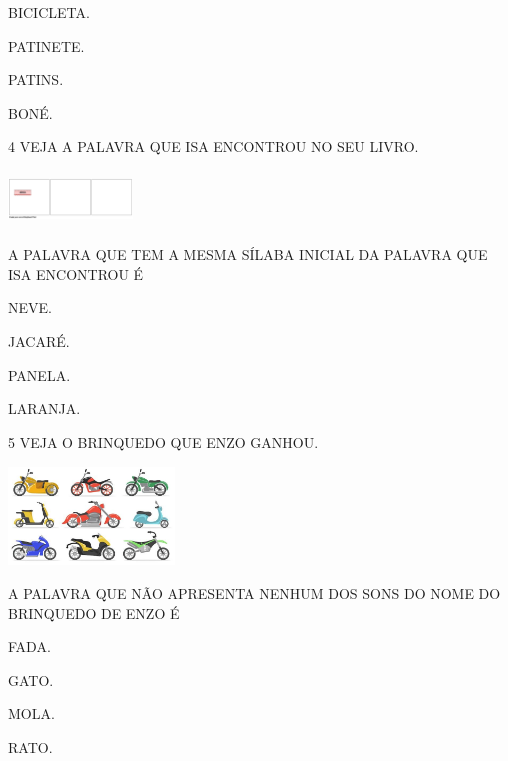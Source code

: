 \begin{escolha}
\item BICICLETA.

\item PATINETE.

\item PATINS.

\item BONÉ.
\end{escolha}

\num{4} VEJA A PALAVRA QUE ISA ENCONTROU NO SEU LIVRO. 


\includegraphics[width=1.29722in,height=0.57917in]{media/image244.png}

A PALAVRA QUE TEM A MESMA SÍLABA INICIAL DA PALAVRA QUE ISA ENCONTROU É

\begin{escolha}
\item NEVE.

\item JACARÉ.

\item PANELA.

\item LARANJA.
\end{escolha}

\num{5} VEJA O BRINQUEDO QUE ENZO GANHOU.

\includegraphics[width=1.73681in,height=1.03125in]{media/image245.jpg}


A PALAVRA QUE NÃO APRESENTA NENHUM DOS SONS DO NOME DO BRINQUEDO DE ENZO É

\begin{escolha}
\item FADA.

\item GATO.

\item MOLA.

\item RATO.
\end{escolha}


